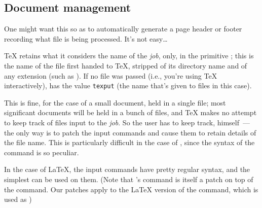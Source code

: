 \subsection{Document management}


One might want this so as to automatically generate a page header or
footer recording what file is being processed.  It's not easy\dots{}

\TeX{} retains what it considers the name of the \emph{job}, only, in
the primitive ; this is the name of the file first
handed to \TeX{}, stripped of its directory name and of any extension
(such as ).  If no file was passed (i.e., you're using
\TeX{} interactively),  has the value \texttt{texput}
(the name that's given to  files in this case).

This is fine, for the case of a small document, held in a single file;
most significant documents will be held in a bunch of files, and
\TeX{} makes no attempt to keep track of files input to the
\emph{job}.  So the user has to keep track, himself~--- the only way
is to patch the input commands and cause them to retain details of the
file name.  This is particularly difficult in the case of \plaintex{},
since the syntax of the  command is so peculiar.

In the case of \LaTeX{}, the input commands have pretty regular
syntax, and the simplest  can be
used on them.  (Note that \latex{}'s  command is itself a
patch on top of the \plaintex{} command.  Our patches apply to the
\LaTeX{} version of the command, which is used as )


